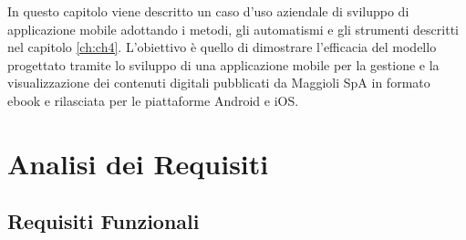 In questo capitolo viene descritto un caso d'uso aziendale di sviluppo di applicazione mobile adottando i metodi, gli automatismi e gli strumenti descritti nel capitolo \ref{ch:ch4}. L'obiettivo è quello di dimostrare l'efficacia del modello progettato tramite lo sviluppo di una applicazione mobile per la gestione e la visualizzazione dei contenuti digitali pubblicati da Maggioli SpA in formato ebook e rilasciata per le piattaforme Android e iOS.

\section{Analisi dei Requisiti}
\subsection{Requisiti Funzionali}
